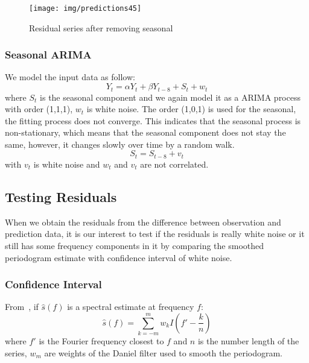 \documentclass[12pt]{article}
\begin{document}
\begin{figure}[ht!]
\centering
\texttt{[image: img/predictions45]}
\caption{Residual series after removing seasonal}\label{fig:predictions45}
\end{figure}

\subsubsection{Seasonal ARIMA}
We model the input data as follow:
\begin{equation}
Y_t = \alpha Y_t+\beta Y_{t-8}+S_t+w_t
\end{equation}
where $S_t$ is the seasonal component and we again model it as a ARIMA process
with order (1,1,1), $w_t$ is white noise. The order (1,0,1) is used for the
seasonal, the fitting process does not converge. This indicates that the seasonal process is
non-stationary, which means that the seasonal component does not stay the same,
however, it changes slowly over time by a random walk.
\begin{equation}
S_t = S_{t-8}+v_t
\end{equation}
with $v_t$ is white noise and $w_t$ and $v_t$ are not correlated.

\subsection{Testing Residuals}
When we obtain the residuals from the difference between observation and
prediction data, it is our interest to test if the residuals is really white
noise or it still has some frequency components in it by comparing the smoothed
periodogram estimate with confidence interval of white noise.

\subsubsection{Confidence Interval}
% 
From~\cite{bloomfieldFourierTimeSeries}, if $\hat{s}(f)$ is a spectral estimate
at frequency $f$: 
\begin{equation}
\hat{s}(f)=\sum_{k=-m}^mw_kI(f'-\frac{k}{n})
\end{equation}
where $f'$ is the Fourier frequency closest to $f$ and $n$ is the number length
of the series, $w_m$ are weights of the Daniel filter used to smooth the
periodogram.
\end{document}
